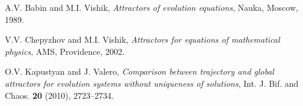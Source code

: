 \documentclass[10pt,a4paper]{article}
\begin{document}
\begin{thebibliography}{6}

 A.V. Babin and M.I. Vishik, \emph{Attractors of evolution
equations}, Nauka, Moscow, 1989.

 V.V. Chepyzhov and M.I. Vishik,
\emph{Attractors for equations of mathematical physics},
AMS, Providence, 2002.

 O.V. Kapustyan and J. Valero,
\emph{Comparison between trajectory and global attractors for evolution systems without uniqueness of solutions}, Int. J. Bif. and Chaos.
\textbf{20} (2010), 2723--2734.

\end{thebibliography}
\end{document}
